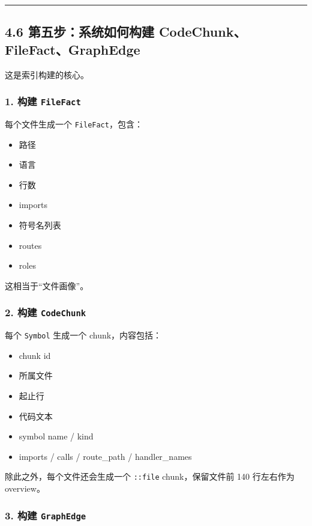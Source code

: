 \documentclass[UTF8,12pt,openany]{ctexbook}
\begin{document}
\hrule

\subsection{4.6 第五步：系统如何构建 CodeChunk、FileFact、GraphEdge}

这是索引构建的核心。\par

\subsubsection{1. 构建 \texttt{FileFact}}

每个文件生成一个 \texttt{FileFact}，包含：\par

\begin{itemize}
\item 路径
\item 语言
\item 行数
\item imports
\item 符号名列表
\item routes
\item roles
\end{itemize}

这相当于“文件画像”。\par

\subsubsection{2. 构建 \texttt{CodeChunk}}

每个 \texttt{Symbol} 生成一个 chunk，内容包括：\par

\begin{itemize}
\item chunk id
\item 所属文件
\item 起止行
\item 代码文本
\item symbol name / kind
\item imports / calls / route\_path / handler\_names
\end{itemize}

除此之外，每个文件还会生成一个 \texttt{::file} chunk，保留文件前 140 行左右作为 overview。\par

\subsubsection{3. 构建 \texttt{GraphEdge}}
\end{document}
